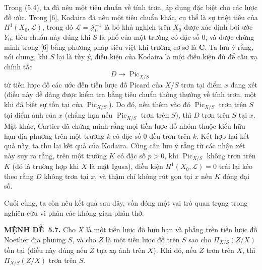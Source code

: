 \documentclass[11pt,twoside,openany]{book}
\numberwithin{equation}{section}
\newcommand{\result}[2]{\par\medskip\noindent\textbf{#1\if\relax\detokenize{#2}\relax\else\ #2\fi.}\quad}
\begin{document}
Trong (5.4), ta đã nêu một tiêu chuẩn về tính trơn, áp dụng đặc biệt cho các
lược đồ ước. Trong [6], Kodaira đã nêu một tiêu chuẩn khác, cụ thể là sự triệt
tiêu của $H^1(X_0,\mathcal L)$, trong đó $\mathcal L=\mathcal J_0^{-1}$ là bó
khả nghịch trên $X_0$ được xác định bởi ước $Y_0$; tiêu chuẩn này đúng khi $S$
là phổ của một trường có đặc số 0, và được chứng minh trong [6] bằng phương
pháp siêu việt khi trường cơ sở là $\mathbf C$. Ta lưu ý rằng, nói chung, khi
$S$ lại là tùy ý, điều kiện của Kodaira là một điều kiện đủ để cấu xạ chính tắc
\[
D\longrightarrow\operatorname{Pic}_{X/S}
\]
từ tiền lược đồ các ước đến tiền lược đồ Picard của $X/S$ trơn tại điểm $x$
đang xét (điều này dễ dàng được kiểm tra bằng tiêu chuẩn thông thường về tính
trơn, một khi đã biết sự tồn tại của $\operatorname{Pic}_{X/S}$). Do đó, nếu
thêm vào đó $\operatorname{Pic}_{X/S}$ trơn trên $S$ tại điểm ảnh của $x$
(chẳng hạn nếu $\operatorname{Pic}_{X/S}$ trơn trên $S$), thì $D$ trơn trên
$S$ tại $x$. Mặt khác, Cartier đã chứng minh rằng mọi tiền lược đồ nhóm thuộc
kiểu hữu hạn địa phương trên một trường $k$ có đặc số 0 đều trơn trên $k$. Kết
hợp hai kết quả này, ta thu lại kết quả của Kodaira. Cũng cần lưu ý rằng từ các
nhận xét này suy ra rằng, trên một trường $K$ có đặc số $p>0$, khi
$\operatorname{Pic}_{X/S}$ không trơn trên $K$ (đó là trường hợp khi $X$ là
mặt Igusa), điều kiện $H^1(X_0,\mathcal L)=0$ trái lại kéo theo rằng $D$ không
trơn tại $x$, và thậm chí không rút gọn tại $x$ nếu $K$ đóng đại số.

Cuối cùng, ta còn nêu kết quả sau đây, vốn đóng một vai trò quan trọng trong
nghiên cứu vi phân các không gian phân thớ:

\result{MỆNH ĐỀ}{5.7} Cho $X$ là một tiền lược đồ hữu hạn và phẳng trên tiền
lược đồ Noether địa phương $S$, và cho $Z$ là một tiền lược đồ trên $S$ sao
cho $\Pi_{X/S}(Z/X)$ tồn tại (điều này đúng nếu $Z$ tựa xạ ảnh trên $X$). Khi
đó, nếu $Z$ trơn trên $X$, thì $\Pi_{X/S}(Z/X)$ trơn trên $S$.
\end{document}
